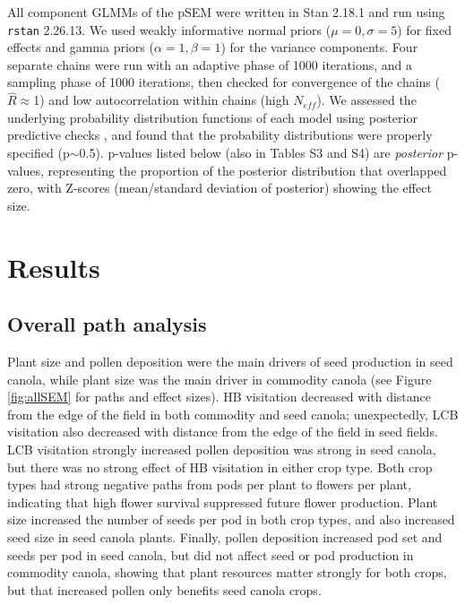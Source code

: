 \documentclass[12pt]{article} %
\begin{document}
All component GLMMs of the pSEM were written in Stan 2.18.1 \citep{gelman2015} and run using \texttt{rstan} 2.26.13.
We used weakly informative normal priors ($\mu=0, \sigma=5$) for fixed effects and gamma priors ($\alpha=1, \beta=1$) for the variance components.
Four separate chains were run with an adaptive phase of 1000 iterations, and a sampling phase of 1000 iterations, then checked for convergence of the chains ($\hat{R} \approx$1) and low autocorrelation within chains (high $N_{eff}$).
We assessed the underlying probability distribution functions of each model using posterior predictive checks \citep{gelman2013}, and found that the probability distributions were properly specified (p$\sim$0.5).
p-values listed below (also in Tables S3 and S4) are \textit{posterior} p-values, representing the proportion of the posterior distribution that overlapped zero, with Z-scores (mean/standard deviation of posterior) showing the effect size.

\section{Results}

\subsection{Overall path analysis}

Plant size and pollen deposition were the main drivers of seed production in seed canola, while plant size was the main driver in commodity canola (see Figure \ref{fig:allSEM} for paths and effect sizes). 
HB visitation decreased with distance from the edge of the field in both commodity and seed canola; unexpectedly, LCB visitation also decreased with distance from the edge of the field in seed fields.
LCB visitation strongly increased pollen deposition was strong in seed canola, but there was no strong effect of HB visitation in either crop type.
Both crop types had strong negative paths from pods per plant to flowers per plant, indicating that high flower survival suppressed future flower production.
Plant size increased the number of seeds per pod in both crop types, and also increased seed size in seed canola plants.
Finally, pollen deposition increased pod set and seeds per pod in seed canola, but did not affect seed or pod production in commodity canola, showing that plant resources matter strongly for both crops, but that increased pollen only benefits seed canola crops.
\end{document}
